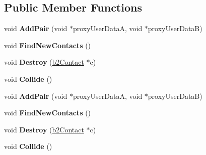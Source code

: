 \subsection*{Public Member Functions}
\begin{DoxyCompactItemize}
\item 
\mbox{\label{classb2ContactManager_ae67a458b64b02bea19955c19cb1fd6f4}} 
void {\bfseries Add\+Pair} (void $\ast$proxy\+User\+DataA, void $\ast$proxy\+User\+DataB)
\item 
\mbox{\label{classb2ContactManager_af72699f83d5a449251c9f93459e0cc40}} 
void {\bfseries Find\+New\+Contacts} ()
\item 
\mbox{\label{classb2ContactManager_a0c331884df23a930837933fc77c9a99b}} 
void {\bfseries Destroy} (\hyperlink{classb2Contact}{b2\+Contact} $\ast$c)
\item 
\mbox{\label{classb2ContactManager_a3380f85adf40f542a7ad6f2e63a76ac6}} 
void {\bfseries Collide} ()
\item 
\mbox{\label{classb2ContactManager_ae67a458b64b02bea19955c19cb1fd6f4}} 
void {\bfseries Add\+Pair} (void $\ast$proxy\+User\+DataA, void $\ast$proxy\+User\+DataB)
\item 
\mbox{\label{classb2ContactManager_af72699f83d5a449251c9f93459e0cc40}} 
void {\bfseries Find\+New\+Contacts} ()
\item 
\mbox{\label{classb2ContactManager_a0c331884df23a930837933fc77c9a99b}} 
void {\bfseries Destroy} (\hyperlink{classb2Contact}{b2\+Contact} $\ast$c)
\item 
\mbox{\label{classb2ContactManager_a3380f85adf40f542a7ad6f2e63a76ac6}} 
void {\bfseries Collide} ()
\end{DoxyCompactItemize}
